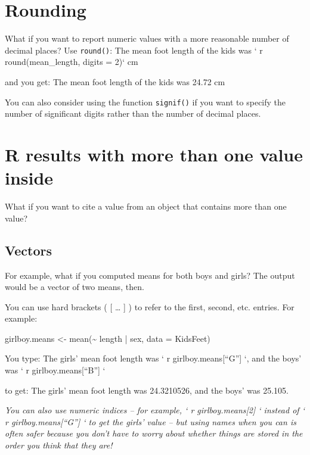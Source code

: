 \documentclass[
  letterpaper,
  DIV=11,
  numbers=noendperiod]{scrreprt}
\newenvironment{Shaded}{\begin{snugshade}}{\end{snugshade}}
\newcommand{\AttributeTok}[1]{\textcolor[rgb]{0.40,0.45,0.13}{#1}}
\newcommand{\FunctionTok}[1]{\textcolor[rgb]{0.28,0.35,0.67}{#1}}
\newcommand{\NormalTok}[1]{\textcolor[rgb]{0.00,0.23,0.31}{#1}}
\newcommand{\OtherTok}[1]{\textcolor[rgb]{0.00,0.23,0.31}{#1}}
\newcommand{\SpecialCharTok}[1]{\textcolor[rgb]{0.37,0.37,0.37}{#1}}
\theoremstyle{remark}
\begin{document}
\section{Rounding}\label{rounding}

What if you want to report numeric values with a more reasonable number
of decimal places? Use \texttt{round()}: The mean foot length of the
kids was ` r round(mean\_length, digits = 2)` cm

and you get: The mean foot length of the kids was 24.72 cm

You can also consider using the function \texttt{signif()} if you want
to specify the number of significant digits rather than the number of
decimal places.

\section{R results with more than one value
inside}\label{r-results-with-more-than-one-value-inside}

What if you want to cite a value from an object that contains more than
one value?

\subsection{Vectors}\label{vectors}

For example, what if you computed means for both boys and girls? The
output would be a vector of two means, then.

You can use hard brackets ( {[} \ldots{} {]} ) to refer to the first,
second, etc. entries. For example:

\begin{Shaded}
\begin{Highlighting}[]
\NormalTok{girlboy.means }\OtherTok{\textless{}{-}} \FunctionTok{mean}\NormalTok{(}\SpecialCharTok{\textasciitilde{}}\NormalTok{ length }\SpecialCharTok{|}\NormalTok{ sex,}
                      \AttributeTok{data =}\NormalTok{ KidsFeet)}
\end{Highlighting}
\end{Shaded}

You type: The girls' mean foot length was ` r girlboy.means{[}``G''{]}
`, and the boys' was ` r girlboy.means{[}``B''{]} `

to get: The girls' mean foot length was 24.3210526, and the boys' was
25.105.

\emph{You can also use numeric indices -- for example, ` r
girlboy.means{[}2{]} ` instead of ` r girlboy.means{[}``G''{]} ` to get
the girls' value -- but using names when you can is often safer because
you don't have to worry about whether things are stored in the order you
think that they are!}
\end{document}
